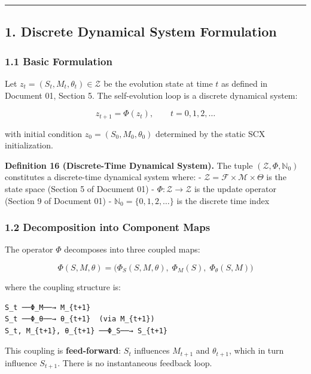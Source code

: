 \documentclass[
  12pt,
]{ctexart}
\begin{document}
\begin{center}\rule{0.5\linewidth}{0.5pt}\end{center}

\subsection{1. Discrete Dynamical System
Formulation}\label{discrete-dynamical-system-formulation}

\subsubsection{1.1 Basic Formulation}\label{basic-formulation}

Let \(z_t = (S_t, M_t, \theta_t) \in \mathcal{Z}\) be the evolution
state at time \(t\) as defined in Document 01, Section 5. The
self-evolution loop is a discrete dynamical system:

\[z_{t+1} = \Phi(z_t), \qquad t = 0, 1, 2, \dots\]

with initial condition \(z_0 = (S_0, M_0, \theta_0)\) determined by the
static SCX initialization.

\textbf{Definition 16 (Discrete-Time Dynamical System).} The tuple
\((\mathcal{Z}, \Phi, \mathbb{N}_0)\) constitutes a discrete-time
dynamical system where: -
\(\mathcal{Z} = \mathcal{F} \times \mathcal{M} \times \Theta\) is the
state space (Section 5 of Document 01) -
\(\Phi: \mathcal{Z} \to \mathcal{Z}\) is the update operator (Section 9
of Document 01) - \(\mathbb{N}_0 = \{0, 1, 2, \dots\}\) is the discrete
time index

\subsubsection{1.2 Decomposition into Component
Maps}\label{decomposition-into-component-maps}

The operator \(\Phi\) decomposes into three coupled maps:

\[\Phi(S, M, \theta) = \bigl( \Phi_S(S, M, \theta),\; \Phi_M(S),\; \Phi_\theta(S, M) \bigr)\]

where the coupling structure is:

\begin{verbatim}
S_t ──Φ_M──→ M_{t+1}
S_t ──Φ_θ──→ θ_{t+1}  (via M_{t+1})
S_t, M_{t+1}, θ_{t+1} ──Φ_S──→ S_{t+1}
\end{verbatim}

This coupling is \textbf{feed-forward}: \(S_t\) influences \(M_{t+1}\)
and \(\theta_{t+1}\), which in turn influence \(S_{t+1}\). There is no
instantaneous feedback loop.
\end{document}
